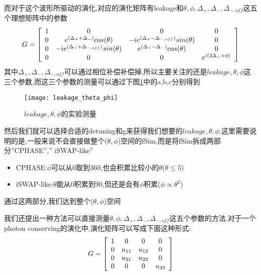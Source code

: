 而对于这个波形所驱动的演化,对应的演化矩阵有leakage和$\theta,\phi,\Delta_{+},\Delta_{-},\Delta_{-,off}$这五个理想矩阵中的参数
\begin{equation}
\centering 
G=\left[
\begin{array}{cccc}  
1 & 0 & 0 & 0\\ 
0 & e^{(\Delta_{+}+\Delta_{-})}cos(\theta) & -ie^{(\Delta_{+}-\Delta_{-,off})}sin(\theta) & 0\\ 
0 & -ie^{(\Delta_{+}+\Delta_{-,off})}sin(\theta) & e^{(\Delta_{+}-\Delta_{-})}cos(\theta) & 0\\ 
0 & 0 & 0 & e^{i(2\Delta_{+}+\phi)}\\ 
\end{array}
\right ]
\end{equation}
其中$\Delta_{+},\Delta_{-},\Delta_{-,off}$可以通过相位补偿补偿掉,所以主要关注的还是$leakage,\theta,\phi$这三个参数,而这三个参数的测量可以通过下图\ref{leakage_theta_phi}中的a,b,c分别得到
\begin{figure}
	\centering
	\texttt{[image: leakage\_theta\_phi]}
	\caption{$leakage,\theta,\phi$的实验测量} 
	\label{leakage_theta_phi}
\end{figure}
然后我们就可以选择合适的detuning和g来获得我们想要的$leakage,\theta,\phi$.这里需要说明的是,一般来说不会直接做整个($\theta,\phi$)空间的fSim,而是将fSim拆成两部分”CPHASE”,” iSWAP-like”
\begin{itemize}
	\item CPHASE:$\phi$可以从0取到360,也会积累比较小的$\theta$($\theta \leq 5$)
	\item iSWAP-like:$\theta$能从0积累到90,但还是会有$\phi$积累($\phi \propto \theta^{2}$)
\end{itemize}
通过这两部分,我们达到整个($\theta,\phi$)空间

我们还提出一种方法可以直接测量$\theta,\phi,\Delta_{+},\Delta_{-},\Delta_{-,off}$这五个参数的方法.对于一个photon conserving的演化中,演化矩阵可以写成下面这种形式:
\begin{equation}
\centering 
G=\left[
\begin{array}{cccc}  
1 & 0 & 0 & 0\\ 
0 & u_{11} & u_{12} & 0\\ 
0 & u_{21} & u_{22} & 0\\ 
0 & 0 & 0  & u_{33}\\ 
\end{array}
\right ]
\end{equation}


